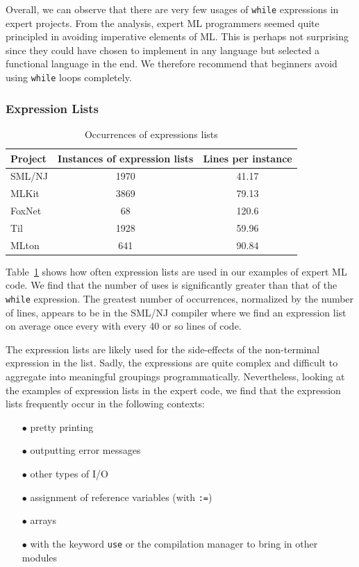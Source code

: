\documentclass[12pt,abstracton]{scrartcl}
\begin{document}
Overall, we can observe that there are very few usages of \texttt{while} expressions
in expert projects.
From the analysis, expert ML programmers seemed quite principled in avoiding imperative
elements of ML. This is perhaps not surprising since they could have chosen
to implement in any language but selected a functional language in the end.
We therefore recommend that beginners avoid using \texttt{while} loops completely.
\subsubsection{Expression Lists}
\begin{table}[h!]
\centering
\begin{tabular}{|l||c|c|}
\hline
Project & Instances of expression lists & Lines per instance \\ \hline\hline
SML/NJ & 1970 & 41.17 \\
MLKit & 3869 & 79.13 \\
FoxNet & 68 & 120.6 \\
Til & 1928 & 59.96 \\
MLton & 641 & 90.84 \\ \hline
\end{tabular}
\caption{Occurrences of expressions lists}
\label{table:explist}
\end{table}
Table~\ref{table:explist} shows how often expression lists are used in our
examples of expert ML code. We find that the number of uses is significantly
greater than that of the \texttt{while} expression. The greatest number
of occurrences, normalized by the number of lines, appears to be in the SML/NJ
compiler where we find an expression list on average once every with every
40 or so lines of code.

The expression lists are likely used for the side-effects of the non-terminal
expression in the list. Sadly, the expressions are quite complex and difficult
to aggregate into meaningful groupings programmatically. Nevertheless,
looking at the examples of expression lists in the expert code, we find that
the expression lists frequently occur in the following contexts:
\begin{itemize}
\item[$\bullet$] pretty printing
\item[$\bullet$] outputting error messages
\item[$\bullet$] other types of I/O
\item[$\bullet$] assignment of reference variables (with \texttt{:=})
\item[$\bullet$] arrays
\item[$\bullet$] with the keyword \texttt{use} or the compilation manager to bring in other modules
\end{itemize}
\end{document}
